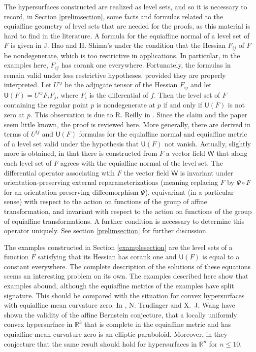 \documentclass [leqno, 10pt]{amsart}
\theoremstyle{definition}
\numberwithin{equation}{section}
\newcommand{\U}{\mathsf{U}}
\newcommand{\nm}{\mathsf{W}}
\newcommand{\rea}{\mathbb R}
\begin{document}
The hypersurfaces constructed are realized as level sets, and so it is necessary to record, in Section \ref{prelimsection}, some facts and formulas related to the equiaffine geometry of level sets that are needed for the proofs, as this material is hard to find in the literature. A formula for the equiaffine normal of a level set of $F$ is given in J. Hao and H. Shima's \cite{Hao-Shima} under the condition that the Hessian $F_{ij}$ of $F$ be nondegenerate, which is too restrictive in applications. In particular, in the examples here, $F_{ij}$ has corank one everywhere. Fortunately, the formulas in \cite{Hao-Shima} remain valid under less restrictive hypotheses, provided they are properly interpreted. Let $U^{ij}$ be the adjugate tensor of the Hessian $F_{ij}$ and let $\U(F) = U^{ij}F_{i}F_{j}$, where $F_{i}$ is the differential of $f$. Then the level set of $F$ containing the regular point $p$ is nondegenerate at $p$ if and only if $\U(F)$ is not zero at $p$. This observation is due to R. Reilly in \cite{Reilly-affine}. Since the claim and the paper \cite{Reilly-affine} seem little known, the proof is reviewed here. More generally, there are derived in terms of $U^{ij}$ and $\U(F)$ formulas for the equiaffine normal and equiaffine metric of a level set valid under the hypothesis that $\U(F)$ not vanish. Actually, slightly more is obtained, in that there is constructed from $F$ a vector field $\nm$ that along each level set of $F$ agrees with the equiaffine normal of the level set. The differential operator associating wtih $F$ the vector field $\nm$ is invariant under orientation-preserving external reparameterizations (meaning replacing $F$ by $\Psi\circ F$ for an orientation-preserving diffeomorphism $\Psi$), equivariant (in a particular sense) with respect to the action on functions of the group of affine transformation, and invariant with respect to the action on functions of the group of equiaffine transformations. A further condition is necessary to determine this operator uniquely. See section \ref{prelimsection} for further discussion.

The examples constructed in Section \ref{examplesection} are the level sets of a function $F$ satisfying that its Hessian has corank one and $\U(F)$ is equal to a constant everywhere. The complete description of the solutions of these equations seems an interesting problem on its own. The examples described here show that examples abound, although the equiaffine metrics of the examples have split signature. This should be compared with the situation for convex hypersurfaces with equiaffine mean curvature zero. In \cite{Trudinger-Wang-bernstein}, N. Trudinger and X.~J. Wang have shown the validity of the affine Bernstein conjecture, that a locally uniformly convex hypersurface in $\rea^{3}$ that is complete in the equiaffine metric and has equiaffine mean curvature zero is an elliptic paraboloid. Moreover, in \cite{Trudinger-Wang-survey} they conjecture that the same result should hold for hypersurfaces in $\rea^{n}$ for $n \leq 10$.
\end{document}
